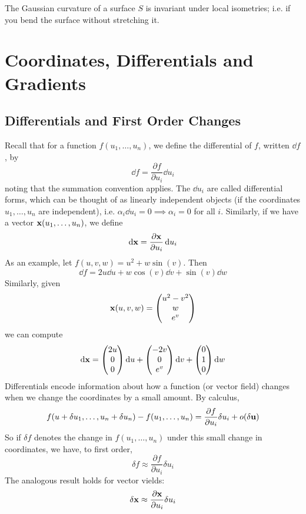 \documentclass{article}
\begin{document}
\begin{theorem}
    The Gaussian curvature of a surface $S$ is invariant under local isometries; i.e. if you bend the surface without stretching it.
\end{theorem}

\section{Coordinates, Differentials and Gradients}
\subsection{Differentials and First Order Changes}
Recall that for a function $f(u_1, \dots, u_n)$, we define the differential of $f$, written $\dd{f}$, by
\[ \dd{f} = \frac{\partial f}{\partial u_i} \dd{u}_i \]
noting that the summation convention applies. The $\dd{u}_i$ are called differential forms, which can be thought of as linearly independent objects (if the coordinates $u_1, \dots, u_n$ are independent), i.e. $\alpha_i \dd{u}_i = 0 \implies \alpha_i = 0$ for all $i$. Similarly, if we have a vector $\vb x(u_1, \dots, u_n)$, we define
\[ \dd \vb x = \frac{\partial \vb x}{\partial u_i} \dd{u}_i \]
As an example, let $f(u, v, w) = u^2 + w \sin(v)$. Then
\[ \dd{f} = 2u \dd{u} + w \cos(v) \dd{v} + \sin(v) \dd{w} \]
Similarly, given
\[ \vb x(u, v, w) = \begin{pmatrix}
        u^2 - v^2 \\ w \\ e^v
    \end{pmatrix} \]
we can compute
\[ \dd \vb x = \begin{pmatrix}
        2u \\ 0 \\ 0
    \end{pmatrix} \dd{u} + \begin{pmatrix}
        -2v \\ 0 \\ e^v
    \end{pmatrix} \dd{v} + \begin{pmatrix}
        0 \\ 1 \\ 0
    \end{pmatrix} \dd{w} \]
Differentials encode information about how a function (or vector field) changes when we change the coordinates by a small amount. By calculus,
\[ f(u + \delta u_1, \dots, u_n + \delta u_n) - f(u_1, \dots, u_n) = \frac{\partial f}{\partial u_i} \delta u_i + o(\delta \vb u) \]
So if $\delta f$ denotes the change in $f(u_1, \dots, u_n)$ under this small change in coordinates, we have, to first order,
\[ \delta f \approx \frac{\partial f}{\partial u_i}\delta u_i \]
The analogous result holds for vector vields:
\[ \delta \vb x \approx \frac{\partial \vb x}{\partial u_i}\delta u_i \]
\end{document}
